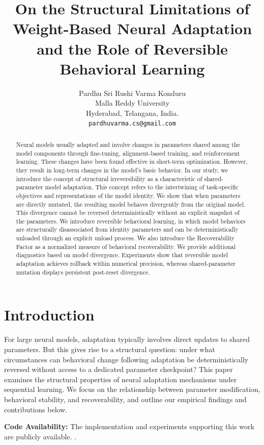 \documentclass{article}
\title{On the Structural Limitations of Weight-Based Neural Adaptation and the Role of Reversible Behavioral Learning}
\author{
	Pardhu Sri Rushi Varma Konduru \\
	Malla Reddy University \\
	Hyderabad, Telangana, India.\\
	\texttt{pardhuvarma.cs@gmail.com} \\
}
\begin{document}
	\maketitle
	\thispagestyle{empty}
	
	
\begin{abstract}
	Neural models usually adapted and involve changes in parameters shared among the model components through fine-tuning, alignment-based training, and reinforcement learning. These changes have been found effective in short-term optimization. However, they result in long-term changes in the model’s basic behavior. In our study, we introduce the concept of structural irreversibility as a characteristic of shared-parameter model adaptation. This concept refers to the intertwining of task-specific objectives and representations of the model identity. We show that when parameters are directly mutated, the resulting model behaves divergently from the original model. This divergence cannot be reversed deterministically without an explicit snapshot of the parameters. We introduce reversible behavioral learning, in which model behaviors are structurally disassociated from identity parameters and can be deterministically unloaded through an explicit unload process. We also introduce the Recoverability Factor as a normalized measure of behavioral recoverability. We provide additional diagnostics based on model divergence. Experiments show that reversible model adaptation achieves rollback within numerical precision, whereas shared-parameter mutation displays persistent post-reset divergence.
\end{abstract}
	
	\section{Introduction}
	\label{sec:intro}
	For large neural models, adaptation typically involves direct updates to shared parameters. But this gives rise to a structural question: under what circumstances can behavioral change following adaptation be deterministically reversed without access to a dedicated parameter checkpoint? This paper examines the structural properties of neural adaptation mechanisms under sequential learning. We focus on the relationship between parameter modification, behavioral stability, and recoverability, and outline our empirical findings and contributions below.
	
	\noindent\textbf{Code Availability:} 
	The implementation and experiments supporting this work are publicly available. \cite{Varma2026rlae}.
	
\end{document}
